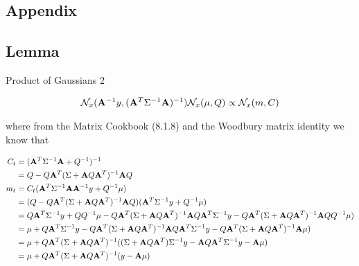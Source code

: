 \clearpage
\clearpage
\begin{center}
\begin{minipage}[c]{\textwidth}

\section{Appendix}




\subsection{Lemma} Product of Gaussians 2
\label{lemma:woodburrymatrixreduce}

\begin{align}
\mathcal{N}_{x} ({\bf A}^{-1}  y , ( {\bf A}^T  \Sigma^{-1} {\bf A} )^{-1} ) \mathcal{N}_{x} ( \mu , Q ) \propto \mathcal{N}_{x} ( m, C ) 
\end{align}

where from the Matrix Cookbook (8.1.8) and the Woodbury matrix identity we know that 

\begin{align}
 C_t & = ( {\bf A}^T  \Sigma^{-1} {\bf A} + Q^{-1} )^{-1}   \\
 & = Q - Q{\bf A}^T ( \Sigma + {\bf A} Q {\bf A}^T )^{-1} {\bf A} Q \\
 m_t & = C_t ( {\bf A}^T  \Sigma^{-1} {\bf A} {\bf A}^{-1}  y +  Q^{-1} \mu ) \\
 & = (Q - Q{\bf A}^T ( \Sigma + {\bf A} Q {\bf A}^T )^{-1} {\bf A} Q ) ( {\bf A}^T  \Sigma^{-1} y +  Q^{-1} \mu ) \\
 & = Q{\bf A}^T  \Sigma^{-1} y + Q Q^{-1} \mu  - Q{\bf A}^T ( \Sigma + {\bf A} Q {\bf A}^T )^{-1} {\bf A} Q  {\bf A}^T  \Sigma^{-1} y -   Q{\bf A}^T ( \Sigma + {\bf A} Q {\bf A}^T )^{-1} {\bf A} Q Q^{-1} \mu ) \\
 & =  \mu  + Q{\bf A}^T  \Sigma^{-1} y - Q{\bf A}^T ( \Sigma + {\bf A} Q {\bf A}^T )^{-1} {\bf A} Q  {\bf A}^T  \Sigma^{-1} y -   Q{\bf A}^T ( \Sigma + {\bf A} Q {\bf A}^T )^{-1} {\bf A} \mu ) \\
 & =  \mu  + Q{\bf A}^T ( \Sigma + {\bf A} Q {\bf A}^T )^{-1} ( ( \Sigma + {\bf A} Q {\bf A}^T ) \Sigma^{-1} y -  {\bf A} Q  {\bf A}^T  \Sigma^{-1} y -  {\bf A} \mu ) \\
& =  \mu  + Q{\bf A}^T ( \Sigma + {\bf A} Q {\bf A}^T )^{-1} (  y -  {\bf A} \mu ) 
\end{align}










\end{minipage}
\end{center}